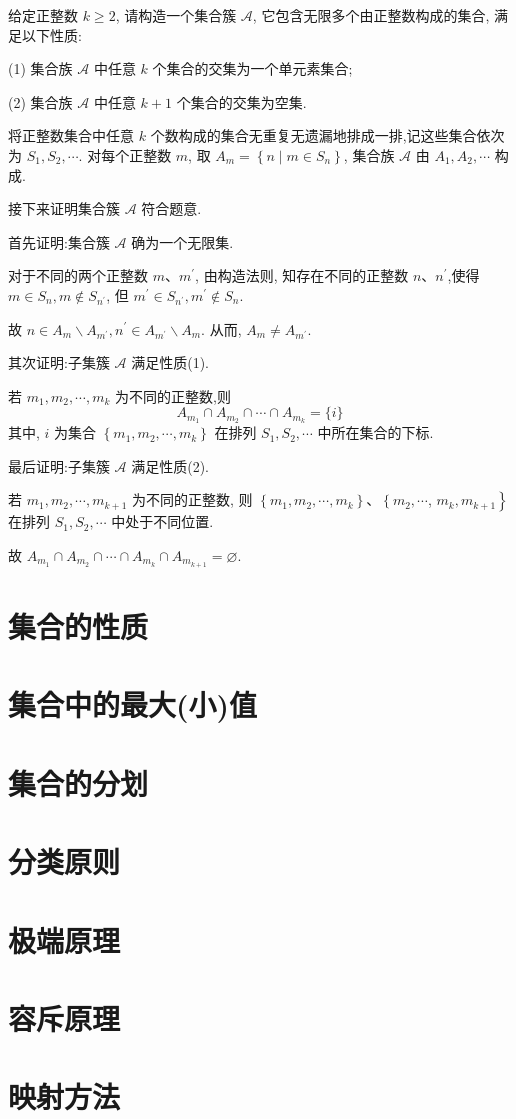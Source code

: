 \begin{example}
	给定正整数 $k \geqslant 2$, 请构造一个集合簇 $\mathscr{A}$, 它包含无限多个由正整数构成的集合, 满足以下性质:

	(1) 集合族 $\mathscr{A}$ 中任意 $k$ 个集合的交集为一个单元素集合;

	(2) 集合族 $\mathscr{A}$ 中任意 $k+1$ 个集合的交集为空集.
\end{example}
\begin{solution}
	将正整数集合中任意 $k$ 个数构成的集合无重复无遗漏地排成一排,记这些集合依次为 $S_{1}, S_{2}, \cdots$. 对每个正整数 $m$, 取 $A_{m}=\left\{n \mid m \in S_{n}\right\}$, 集合族 $\mathscr{A}$ 由 $A_{1}, A_{2}, \cdots$ 构成.

	接下来证明集合簇 $\mathscr{A}$ 符合题意.

	首先证明:集合簇 $\mathscr{A}$ 确为一个无限集.

	对于不同的两个正整数 $m 、 m^{\prime}$, 由构造法则, 知存在不同的正整数 $n 、 n^{\prime}$,使得 $m \in S_{n}, m \notin S_{n^{\prime}}$, 但 $m^{\prime} \in S_{n^{\prime}}, m^{\prime} \notin S_{n}$.

	故 $n \in A_{m} \backslash A_{m^{\prime}}, n^{\prime} \in A_{m^{\prime}} \backslash A_{m}$. 从而, $A_{m} \neq A_{m^{\prime}}$.

	其次证明:子集簇  $\mathscr{A}$ 满足性质(1).

	若 $m_{1}, m_{2}, \cdots, m_{k}$ 为不同的正整数,则
	$$
		A_{m_{1}} \cap A_{m_{2}} \cap \cdots \cap A_{m_{k}}=\{i\}
	$$
	其中, $i$ 为集合 $\left\{m_{1}, m_{2}, \cdots, m_{k}\right\}$ 在排列 $S_{1}, S_{2}, \cdots$ 中所在集合的下标.

	最后证明:子集簇 $\mathscr{A}$ 满足性质(2).

	若 $m_{1}, m_{2}, \cdots, m_{k+1}$ 为不同的正整数, 则 $\left\{m_{1}, m_{2}, \cdots, m_{k}\right\} 、\left\{m_{2}, \cdots\right.$, $\left.m_{k}, m_{k+1}\right\}$ 在排列 $S_{1}, S_{2}, \cdots$ 中处于不同位置.

	故 $A_{m_{1}} \cap A_{m_{2}} \cap \cdots \cap A_{m_{k}} \cap A_{m_{k+1}}=\varnothing$.
\end{solution}

\section{集合的性质}
\section{集合中的最大(小)值}
\section{集合的分划}
\section{分类原则}
\section{极端原理}
\section{ 容斥原理}
\section{ 映射方法}